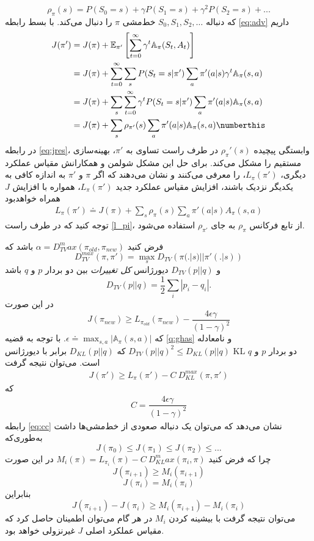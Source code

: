 $$\rho_\pi(s) = P(S_0=s) + \gamma P(S_1=s) + \gamma^2 P(S_2=s) + ...$$
که دنباله 
$S_0, S_1, S_2, \dots$
 خط‌مشی $\pi$ را دنبال می‌کند.
با بسط رابطه
\ref{eq:adv}
داریم
\begin{align}
J(\pi')  & = J(\pi) + \mathbb{E}_{\pi'}\left[\sum_{t=0}^{\infty} \gamma^t \mathbb{A}_\pi(S_t, A_t)\right] \\
& = J(\pi) + \sum_{t=0}^{\infty} \sum_{s} P(S_t = s| \pi') \sum_{a} \pi'(a|s) \gamma^t \mathbb{A}_\pi(s,a) \\
& = J(\pi) + \sum_{s} \sum_{t=0}^{\infty} \gamma^t P(S_t = s | \pi') \sum_{a} \pi'(a|s) \mathbb{A}_\pi(s,a) \\
& = J(\pi) + \sum_{s} \rho_{\pi'}(s) \sum_{a} \pi'(a|s) \mathbb{A}_\pi(s,a) \numberthis
\label{eq:jres}
\end{align}
در رابطه 
\ref{eq:jres}،
وابستگی پیچیده  $\rho_\pi'(s)$ در طرف راست تساوی به $\pi'$، بهینه‌سازی مستقیم را مشکل می‌کند.
برای حل این مشکل شولمن و همکارانش 
\cite{schulman2015trust}
مقیاس عملکرد دیگری، $L_\pi(\pi')$، را معرفی می‌کنند و نشان می‌دهند که اگر $\pi$ و $\pi'$ به اندازه کافی به یکدیگر نزدیک باشند، افزایش مقیاس عملکرد جدید $L_\pi(\pi')$، همواره با افزایش $J$ همراه خواهد‌بود
\begin{align}
	L_\pi(\pi') \doteq J(\pi) + \sum_{s} \rho_{\pi}(s) \sum_{a} \pi'(a|s) A_\pi(s,a)
	\label{l_pi}
\end{align}
توجه کنید که در طرف راست 
\ref{l_pi}،
 از تابع فرکانس $\rho_\pi$ به جای 
 $\rho_{\pi'}$
استفاده می‌شود.

فرض کنید 
$\alpha = D_{TV}^max(\pi_{old}, \pi_{new})$
باشد که 
$$D_{TV}^{max} (\pi, \pi') = \max_{s} D_{TV}\left(\pi(.|s) || \pi'(.|s)\right)$$
و 
$D_{TV}(p || q)$
دیورژانس 
\textit{کل تغییرات}
بین دو بردار $p$ و $q$ باشد
$$D_{TV}(p || q) = \dfrac{1}{2} \sum_{i} |p_i - q_i|.$$ در این صورت
$$J(\pi_{new}) \ge L_{\pi_{old}}(\pi_{new}) - \dfrac{4 \epsilon \gamma}{(1- \gamma)^2}$$ که $\epsilon \doteq \max_{s,a} |\mathbb{A}_\pi(s,a)|$.
\label{q:ghas}
با توجه به قضیه \ref{q:ghas} و نامعادله $D_{TV}(p || q)^2 \le D_{KL}(p || q)$  که  $D_{KL} (p || q)$ برابر با دیورژانس KL دو بردار $p$ و $q$ است\cite{schulman2015trust}. می‌توان  نتیجه گرفت
\begin{align*}
	J(\pi') \ge L_{\pi}(\pi') - C \ D_{KL}^{max}(\pi, \pi')
\end{align*}
که
\begin{align}
	C = \dfrac{4 \epsilon \gamma}{(1-\gamma)^2}
	\label{eq:cc}
\end{align}
رابطه \ref{eq:cc} نشان می‌دهد که می‌توان یک دنباله صعودی از خط‌مشی‌ها داشت به‌طوری‌که
$$J(\pi_0) \le J(\pi_1) \le J(\pi_2) \le ... $$
چرا که فرض کنید
$M_i(\pi) = L_{\pi_i}(\pi) - C \ D_{KL}^max(\pi_i, \pi)$
در این صورت
 $$J(\pi_{i+1}) \ge M_i(\pi_{i+1}) $$ 
$$J(\pi_i) = M_i(\pi_i)$$
بنابراین
$$J(\pi_{i+1}) - J(\pi_i) \ge M_i(\pi_{i+1}) - M_i(\pi_i)$$
می‌توان نتیجه گرفت با بیشینه کردن $M_i$ در هر گام می‌توان اطمینان حاصل کرد که مقیاس عملکرد اصلی $J$ غیرنزولی خواهد بود.

